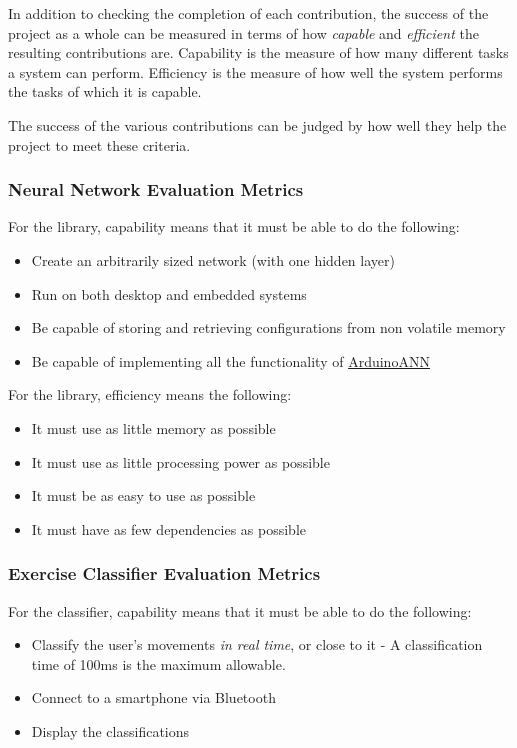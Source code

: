 \documentclass[a4paper]{article}
\begin{document}
In addition to checking the completion of each contribution, the success of the project as a whole can be measured in terms of how \textit{capable} and \textit{efficient} the resulting contributions are. Capability is the measure of how many different tasks a system can perform.
Efficiency is the measure of how well the system performs the tasks of which it is capable. 

The success of the various contributions can be judged by how well they help the project to meet these criteria.

\subsubsection{Neural Network Evaluation Metrics}
\label{subsubsec:in_cs_nnmetrics}

For the library, capability means that it must be able to do the following:

\begin{itemize}
\item Create an arbitrarily sized network (with one hidden layer)
\item Run on both desktop and embedded systems
\item Be capable of storing and retrieving configurations from non volatile memory
\item Be capable of implementing all the functionality of \hyperref[subsec:bg_arduinoann]{ArduinoANN}
\end{itemize}

For the library, efficiency means the following:

\begin{itemize}
\item It must use as little memory as possible
\item It must use as little processing power as possible
\item It must be as easy to use as possible
\item It must have as few dependencies as possible
\end{itemize}

\subsubsection{Exercise Classifier Evaluation Metrics}
\label{subsubsec:in_cs_ecmetrics}

For the classifier, capability means that it must be able to do the following:

\begin{itemize}
\item Classify the user's movements \textit{in real time}, or close to it - A classification time of 100ms is the maximum allowable.
\item Connect to a smartphone via Bluetooth
\item Display the classifications
\end{itemize}
\end{document}
